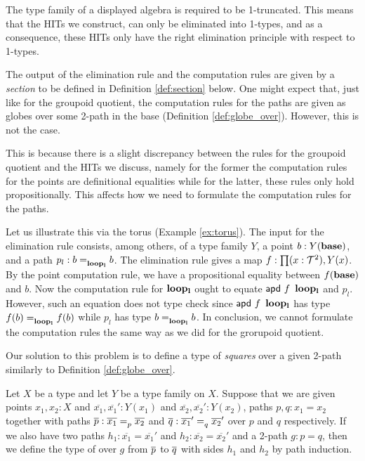 \begin{remark}
The type family of a displayed algebra is required to be 1-truncated.
This means that the HITs we construct, can only be eliminated into 1-types,
and as a consequence, these HITs only have the right elimination principle with respect to 1-types.
\end{remark}

The output of the elimination rule and the computation rules are given by a \emph{section} to be defined in Definition \ref{def:section} below.
One might expect that, just like for the groupoid quotient, the computation rules for the paths
are given as globes over some 2-path in the base (Definition \ref{def:globe_over}).
However, this is not the case.

This is because there is a slight discrepancy between the rules for the groupoid quotient and the HITs we discuss,
namely for the former the computation rules for the points are definitional equalities
while for the latter, these rules only hold propositionally.
This affects how we need to formulate the computation rules for the paths.

Let us illustrate this via the torus (Example \ref{ex:torus}).
The input for the elimination rule consists, among others, of a type family $Y$, a point $b : Y(\base)$,
and a path $p_l : \pathover{\leftLoop}{b}{b}$.
The elimination rule gives a map $f : \depprod{(x : \torus)}{Y(x)}$.
By the point computation rule, we have a propositional equality between $f(\base)$ and $b$.
Now the computation rule for $\leftLoop$ ought to equate $\apd{f}{\leftLoop}$ and $p_l$.
However, such an equation does not type check since $\apd{f}{\leftLoop}$ has type $\pathover{\leftLoop}{f(b)}{f(b)}$ while $p_l$ has type $\pathover{\leftLoop}{b}{b}$.
In conclusion, we cannot formulate the computation rules the same way as we did for the grorupoid quotient.

Our solution to this problem is to define a type of \emph{squares} over a given 2-path similarly to Definition \ref{def:globe_over}.

\begin{definition}
Let $X$ be a type and let $Y$ be a type family on $X$.
Suppose that we are given points $x_1, x_2 : X$ and $\overline{x_1}, \overline{x_1}' : Y(x_1)$ and $\overline{x_2}, \overline{x_2}' : Y(x_2)$, paths $p, q : x_1 = x_2$ together with paths $\pover{p} : \pathover{p}{\overline{x_1}}{\overline{x_2}}$ and $\pover{q} : \pathover{q}{\overline{x_1}'}{\overline{x_2}'}$ over $p$ and $q$ respectively.
If we also have two paths $h_1 : \overline{x_1} = \overline{x_1}'$ and $h_2 : \overline{x_2} = \overline{x_2}'$ and a 2-path $g : p = q$,
then we define the type of  over $g$ from $\pover{p}$ to $\pover{q}$ with sides $h_1$ and $h_2$ by path induction.
\end{definition}

